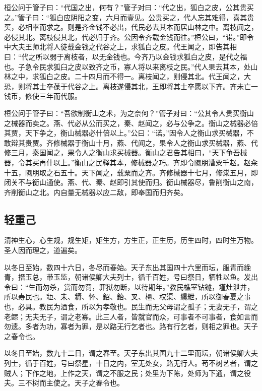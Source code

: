 \documentclass[]{article}
\begin{document}
桓公问于管子曰：``代国之出，何有？''管子对曰：``代之出，狐白之皮，公其贵买之。''管子曰：``狐白应阴阳之变，六月而壹见。公贵买之，代人忘其难得，喜其贵买，必相率而求之。则是齐金钱不必出，代民必去其本而居山林之中。离枝闻之，必侵其北。离枝侵其北，代必归于齐。公因令齐载金钱而往。''桓公曰，``诺。''即令中大夫王师北将人徒载金钱之代谷之上，求狐白之皮。代王闻之，即告其相曰：``代之所以弱于离枝者，以无金钱也。今齐乃以金钱求狐白之皮，是代之福也。子急令民求狐臼之皮以致齐之币，寡人将以来离枝之民。''代人果去其本，处山林之中，求狐白之皮。二十四月而不得一。离枝闻之，则侵其北。代王闻之，大恐，则将其士卒葆于代谷之上。离枝遂侵其北，王即将其士卒愿以下齐。齐未亡一钱币，修使三年而代服。

桓公问于管子曰：``吾欲制衡山之术，为之奈何？''管子对曰：``公其令人贵买衡山之械器而卖之。燕、代必从公而买之，秦、赵闻之，必与公争之。衡山之械器必倍其贾，天下争之，衡山械器必什倍以上。''公曰：``诺。''因令人之衡山求买械器，不敢辩其贵贾。齐修械器于衡山十月，燕、代闻之，果令人之衡山求买械器，燕、代修三月，秦国闻之，果令人之衡山求买械器。衡山之君告其相曰，``天下争吾械器，令其买再什以上。''衡山之民释其本，修械器之巧。齐即令隰朋漕粟千赵。赵籴十五，隰朋取之石五十。天下闻之，载粟而之齐。齐修械器十七月，修粜五月，即闭关不与衡山通使。燕、代、秦、赵即引其使而归。衡山械器尽，鲁削衡山之南，齐削衡山之北。内自量无械器以应二敌，即奉国而归齐矣。

\hypertarget{header-n1123}{%
\subsection{轻重己}\label{header-n1123}}

清神生心，心生规，规生矩，矩生方，方生正，正生历，历生四时，四时生万物。圣人因而理之，道遍矣。

以冬日至始，数四十六日，冬尽而春始。天子东出其国四十六里而坛，服青而絻青，搢玉总，带玉监，朝诸侯卿大夫列士，循千百姓，号曰祭日，牺牲以鱼。发出令曰：``生而勿杀，赏而勿罚，罪狱勿断，以待期年。''教民樵室钻鐩，墐灶泄井，所以寿民也。耟、耒、耨、怀、鉊、鈶、叉、橿、权渠、繉紲，所以御春夏之事也，必具。教民为酒食，所以为孝敬也。民生而无父母谓之孤子；无妻无子，谓之老鳏；无夫无子，谓之老寡。此三人者，皆就官而众，可事者不可事者，食如言而勿遗。多者为功，寡者为罪，是以路无行乞者也。路有行乞者，则相之罪也。天子之春令也。

以冬日至始，数九十二日，谓之春至。天子东出其国九十二里而坛，朝诸侯卿大夫列士，循于百姓，号曰祭星，十日之内，室无处女，路无行人。苟不树艺者，谓之贼人；下作之地，上作之天，谓之不服之民；处里为下陈，处师为下通，谓之役夫。三不树而主使之。天子之春令也。
\end{document}
